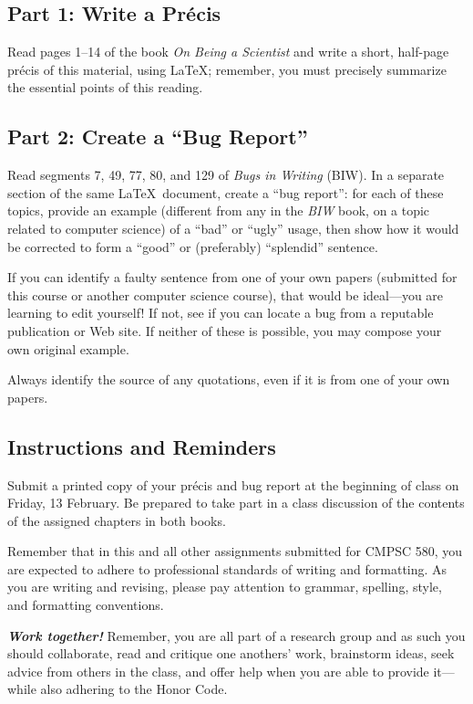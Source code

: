 
\usepackage[compact]{titlesec}




\subsection*{Part 1: Write a Pr\'{e}cis}

Read pages 1--14 of the book {\em On Being a Scientist} and write a short, half-page pr\'{e}cis of this material, using
\LaTeX; remember, you must precisely summarize the essential points of this reading.

\subsection*{Part 2: Create a ``Bug Report''}
Read segments 7, 49, 77, 80, and 129 of {\em Bugs in Writing} (BIW). 
In a separate section of the same \LaTeX\ document, create a
``bug report'': for each
of these topics, provide an example (different from any in the {\em BIW}
book, on a topic
related to computer science) of a ``bad'' or ``ugly'' usage, then show
how it would be corrected to form a ``good'' or (preferably) ``splendid''
sentence.

If you can identify a faulty sentence from one of your own papers (submitted
for this course or another computer science course), that would be ideal---you
    are learning to edit yourself!
If not, see if you can locate a bug from a reputable publication or
Web site. If neither of these is possible, you may compose your own
original example.

Always identify the source of any quotations, even if it is from one of your
own papers.

\subsection*{Instructions and Reminders}

Submit a printed copy of your pr\'{e}cis and bug report at the beginning of class on Friday, 13 February. Be prepared to
take part in a class discussion of the contents of the assigned chapters in both books.

Remember that in this and all other assignments submitted for CMPSC 580, you are expected to adhere to professional
standards of writing and formatting. As you are writing and revising, please pay attention to grammar, spelling, style,
and formatting conventions.

{\large\color{black}\textbf{\textit{Work together!}}} Remember, you are all part of a research group and as such you
should collaborate, read and critique one anothers' work, brainstorm ideas, seek advice from others in the class, and offer
help when you are able to provide it---while also adhering to the Honor Code.


